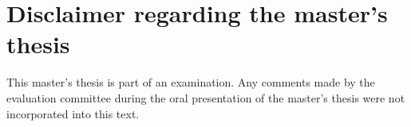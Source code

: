 \chapter*{Disclaimer regarding the master's thesis}

This master's thesis is part of an examination. Any comments made by the evaluation committee during the oral presentation of the master's thesis were not incorporated into this text.